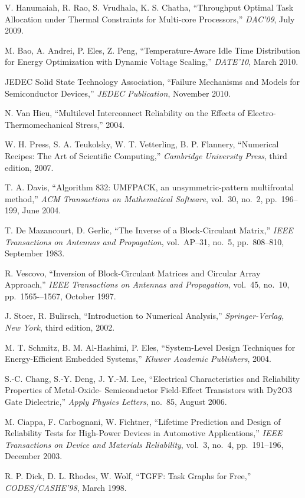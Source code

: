 \begin{thebibliography}{99}
    V. Hanumaiah, R. Rao, S. Vrudhala, K. S. Chatha,
    ``Throughput Optimal Task Allocation under Thermal Constraints for Multi-core Processors,''
    \emph{DAC'09},
    July 2009.

    M. Bao, A. Andrei, P. Eles, Z. Peng,
    ``Temperature-Aware Idle Time Distribution for Energy Optimization with Dynamic Voltage Scaling,''
    \emph{DATE'10},
    March 2010.

    JEDEC Solid State Technology Association,
    ``Failure Mechanisms and Models for Semiconductor Devices,''
    \emph{JEDEC Publication},
    November 2010.

    N. Van Hieu,
    ``Multilevel Interconnect Reliability on the Effects of Electro-Thermomechanical Stress,''
    2004.

    W. H. Press, S. A. Teukolsky, W. T. Vetterling, B. P. Flannery,
    ``Numerical Recipes: The Art of Scientific Computing,''
    \emph{Cambridge University Press},
    third edition, 2007.

    T. A. Davis,
    ``Algorithm 832: UMFPACK, an unsymmetric-pattern multifrontal method,''
    \emph{ACM Transactions on Mathematical Software},
    vol.~30, no.~2, pp.~196--199, June 2004.

    T. De Mazancourt, D. Gerlic,
    ``The Inverse of a Block-Circulant Matrix,''
    \emph{IEEE Transactions on Antennas and Propagation},
    vol.~AP–31, no.~5, pp.~808–810, September 1983.

    R. Vescovo,
    ``Inversion of Block-Circulant Matrices and Circular Array Approach,''
    \emph{IEEE Transactions on Antennas and Propagation},
    vol.~45, no.~10, pp.~1565-–1567, October 1997.

    J. Stoer, R. Bulirsch,
    ``Introduction to Numerical Analysis,''
    \emph{Springer-Verlag, New York},
    third edition, 2002.

    M. T. Schmitz, B. M. Al-Hashimi, P. Eles,
    ``System-Level Design Techniques for Energy-Efficient Embedded Systems,''
    \emph{Kluwer Academic Publishers},
    2004.

    S.-C. Chang, S.-Y. Deng, J. Y.-M. Lee,
    ``Electrical Characteristics and Reliability Properties of Metal-Oxide- Semiconductor Field-Effect Transistors with Dy2O3 Gate Dielectric,''
    \emph{Apply Physics Letters},
    no.~85, August 2006.

    M. Ciappa, F. Carbognani, W. Fichtner,
    ``Lifetime Prediction and Design of Reliability Tests for High-Power Devices in Automotive Applications,''
    \emph{IEEE Transactions on Device and Materials Reliability},
    vol.~3, no.~4, pp.~191--196, December 2003.

    R. P. Dick, D. L. Rhodes, W. Wolf,
    ``TGFF: Task Graphs for Free,''
    \emph{CODES/CASHE'98},
    March 1998.
\end{thebibliography}

